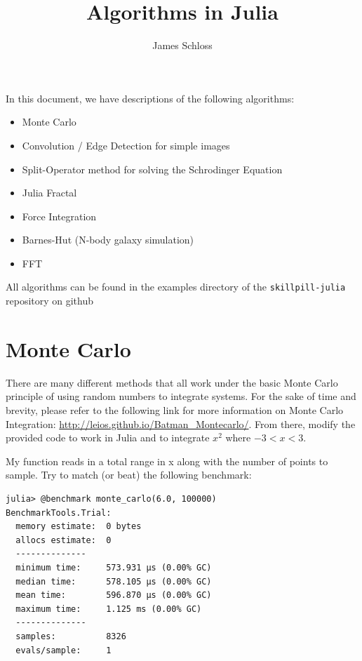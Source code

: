 \documentclass[11pt]{article}
\title{\textbf{Algorithms in Julia}}
\author{James Schloss}
\date{}
\begin{document}
\maketitle
In this document, we have descriptions of the following algorithms:
\begin{itemize}
\item Monte Carlo
\item Convolution / Edge Detection for simple images
\item Split-Operator method for solving the Schrodinger Equation
\item Julia Fractal
\item Force Integration
\item Barnes-Hut (N-body galaxy simulation)
\item FFT
\end{itemize}

All algorithms can be found in the examples directory of the \texttt{skillpill-julia} repository on github

\newpage
\section*{Monte Carlo}

There are many different methods that all work under the basic Monte Carlo principle of using random numbers to integrate systems.
For the sake of time and brevity, please refer to the following link for more information on Monte Carlo Integration: \url{http://leios.github.io/Batman_Montecarlo/}. From there, modify the provided code to work in Julia and to integrate $x^2$ where $-3 < x < 3$.

My function reads in a total range in x along with the number of points to sample. Try to match (or beat) the following benchmark:

\begin{lstlisting}
julia> @benchmark monte_carlo(6.0, 100000)
BenchmarkTools.Trial: 
  memory estimate:  0 bytes
  allocs estimate:  0
  --------------
  minimum time:     573.931 μs (0.00% GC)
  median time:      578.105 μs (0.00% GC)
  mean time:        596.870 μs (0.00% GC)
  maximum time:     1.125 ms (0.00% GC)
  --------------
  samples:          8326
  evals/sample:     1

\end{lstlisting}

\newpage
\end{document}
